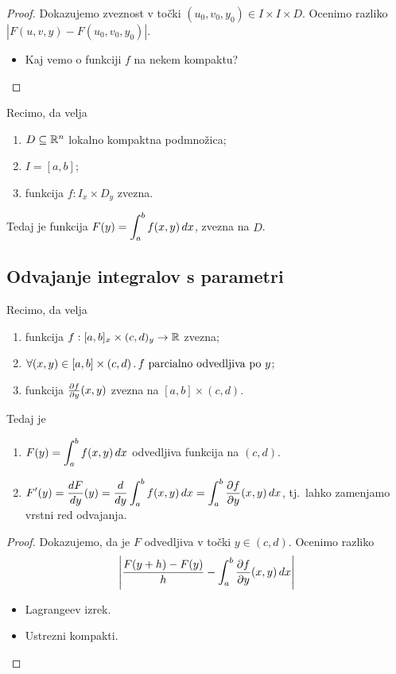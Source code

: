 \begin{proof}
    Dokazujemo zveznost v točki $(u_0, v_0, y_0) \in I \times I \times D$. Ocenimo razliko $|F(u,v,y) - F(u_0, v_0, y_0)|$.
    \begin{itemize}
        \item  Kaj vemo o funkciji $f$ na nekem kompaktu? \qedhere
    \end{itemize}
\end{proof}

\begin{posledica}
    Recimo, da velja
    \begin{enumerate}
        \item $D \subseteq \mathbb{R}^n$ lokalno kompaktna podmnožica;
        \item $I = [a,b]$;
        \item funkcija $f: I_x \times D_y$ zvezna.
    \end{enumerate}
    Tedaj je funkcija $\displaystyle F(y) = \int_{a}^{b}f(x,y) \, dx$, zvezna na $D$.
\end{posledica}

\subsection{Odvajanje integralov s parametri}
\begin{trditev}
    Recimo, da velja
    \begin{enumerate}
        \item funkcija $f:[a,b]_x \times (c,d)_y \to \mathbb{R}$ zvezna;
        \item $\forall (x,y) \in [a,b] \times (c,d) \,.\, f \text{ parcialno odvedljiva po } y$;
        \item funkcija $\frac{\partial f}{\partial y}(x,y)$ zvezna na $[a,b] \times (c,d)$.
    \end{enumerate}
    Tedaj je 
    \begin{enumerate}
        \item $\displaystyle F(y) = \int_{a}^{b}f(x,y) \, dx$ odvedljiva funkcija na $(c,d)$.
        \item $\displaystyle F'(y) = \frac{dF}{dy}(y) = \frac{d}{dy} \int_{a}^{b}f(x,y) \, dx = \int_{a}^{b} \frac{\partial f}{\partial y}(x,y) \, dx$, tj.\ lahko zamenjamo vrstni red odvajanja.
    \end{enumerate}    
\end{trditev}

\begin{proof}
    Dokazujemo, da je $F$ odvedljiva v točki $y \in (c,d)$. Ocenimo razliko $$\displaystyle \left|\frac{F(y+h)-F(y)}{h} - \int_{a}^{b} \frac{\partial f}{\partial y}(x,y) \,dx \right|$$
    \begin{itemize}
        \item Lagrangeev izrek.
        \item Ustrezni kompakti. \qedhere
    \end{itemize}
\end{proof}

